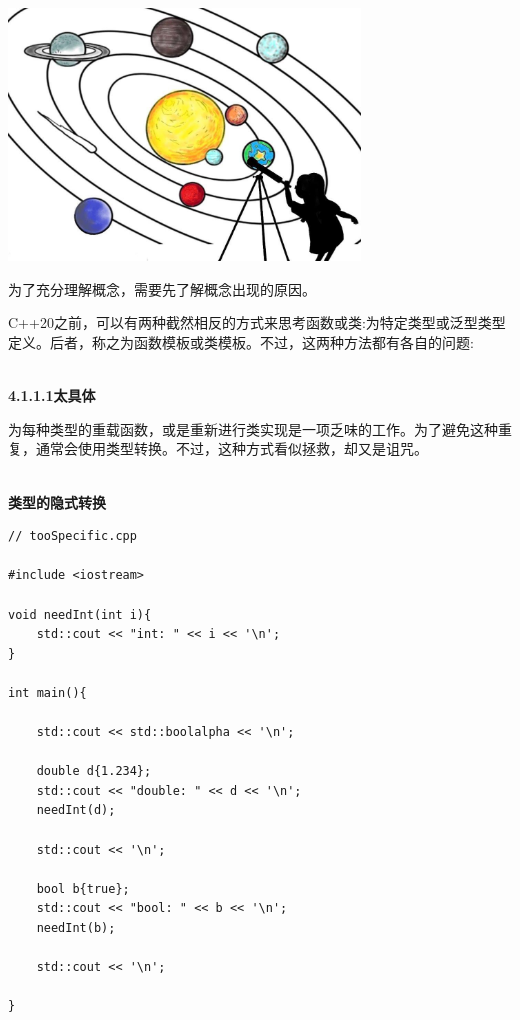 
\begin{center}
\includegraphics[width=0.7\textwidth]{content/3/chapter4/images/2.png}\\
\end{center}

为了充分理解概念，需要先了解概念出现的原因。


C++20之前，可以有两种截然相反的方式来思考函数或类:为特定类型或泛型类型定义。后者，称之为函数模板或类模板。不过，这两种方法都有各自的问题:

\hspace*{\fill} \\ %
\noindent
\textbf{4.1.1.1\hspace{0.2cm}太具体}

为每种类型的重载函数，或是重新进行类实现是一项乏味的工作。为了避免这种重复，通常会使用类型转换。不过，这种方式看似拯救，却又是诅咒。

\hspace*{\fill} \\ %
\noindent
\textbf{类型的隐式转换}
\begin{lstlisting}[style=styleCXX]
// tooSpecific.cpp

#include <iostream>

void needInt(int i){
	std::cout << "int: " << i << '\n';
}

int main(){

	std::cout << std::boolalpha << '\n';

	double d{1.234};
	std::cout << "double: " << d << '\n';
	needInt(d);

	std::cout << '\n';

	bool b{true};
	std::cout << "bool: " << b << '\n';
	needInt(b);

	std::cout << '\n';

}
\end{lstlisting}


